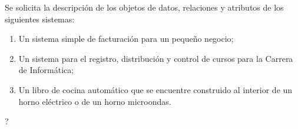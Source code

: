Se solicita la descripción de los objetos de datos, relaciones y atributos de los siguientes sistemas:

\begin{enumerate}
\item Un sistema simple de facturación para un pequeño negocio;
\item Un sistema para el registro, distribución y control de cursos para la Carrera de Informática;
\item Un libro de cocina automático que se encuentre construido al interior de un horno eléctrico o de un horno microondas.
\end{enumerate}

?
